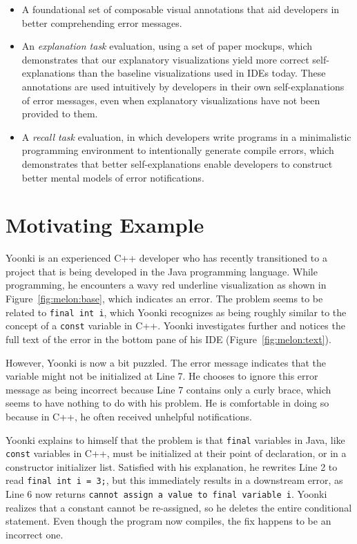 \documentclass[conference]{IEEEtran}
\begin{document}
\begin{itemize}
\item A foundational set of composable visual annotations that aid developers in better comprehending error messages.
\item An \textit{explanation task} evaluation, using a set of paper mockups, which demonstrates that our explanatory visualizations yield more correct self-explanations than the baseline visualizations used in IDEs today. These annotations are used intuitively by developers in their own self-explanations of error messages, even when explanatory visualizations have not been provided to them.
\item A \textit{recall task} evaluation, in which developers write programs in a minimalistic programming environment to intentionally generate compile errors, which demonstrates that better self-explanations enable developers to construct better mental models of error notifications.
\end{itemize}

\section{Motivating Example}

Yoonki is an experienced C++ developer who has recently transitioned to a project that is being developed in the Java programming language. While programming, he encounters a wavy red underline visualization as shown in Figure~\ref{fig:melon:base}, which indicates an error. The problem seems to be related to \texttt{final int i}, which Yoonki recognizes as being roughly similar to the concept of a \texttt{const} variable in C++. Yoonki investigates further and notices the full text of the error in the bottom pane of his IDE (Figure~\ref{fig:melon:text}). 

However, Yoonki is now a bit puzzled. The error message indicates that the variable might not be initialized at Line 7. He chooses to ignore this error message as being incorrect because Line 7 contains only a curly brace, which seems to have nothing to do with his problem. He is comfortable in doing so because in C++, he often received unhelpful notifications.

Yoonki explains to himself that the problem is that \texttt{final} variables in Java, like \texttt{const} variables in C++, must be initialized at their point of declaration, or in a constructor initializer list. Satisfied with his explanation, he rewrites Line 2 to read \texttt{final int i = 3;}, but this immediately results in a downstream error, as Line 6 now returns \texttt{cannot assign a value to final variable i}. Yoonki realizes that a constant cannot be re-assigned, so he deletes the entire conditional statement. Even though the program now compiles, the fix happens to be an incorrect one.
\end{document}
